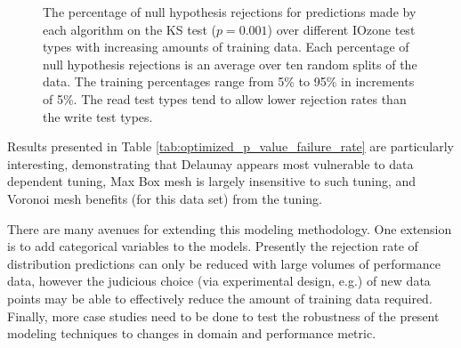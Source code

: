 \documentclass[letterpaper, 10 pt, conference]{ieeeconf}  %
\begin{document}
\begin{figure}
  \caption{The percentage of null hypothesis rejections for predictions made by each algorithm on the KS test ($p=0.001$) over different IOzone test types with increasing amounts of training data. Each percentage of null hypothesis rejections is an average over ten random splits of the data. The training percentages range from 5\% to 95\% in increments of 5\%. The read test types tend to allow lower rejection rates than the write test types.
  \vspace{-.1cm}}
  \label{fig:ks_failure_by_training_and_test}
\end{figure}


Results presented in Table \ref{tab:optimized_p_value_failure_rate} are particularly interesting, demonstrating that Delaunay appears most vulnerable to data dependent tuning, Max Box mesh is largely insensitive to such tuning, and Voronoi mesh benefits (for this data set) from the tuning.

There are many avenues for extending this modeling methodology. One extension is to add categorical variables to the models. Presently the rejection rate of distribution predictions can only be reduced with large volumes of performance data, however the judicious choice (via experimental design, e.g.) of new data points may be able to effectively reduce the amount of training data required. Finally, more case studies need to be done to test the robustness of the present modeling techniques to changes in domain and performance metric.
\end{document}
